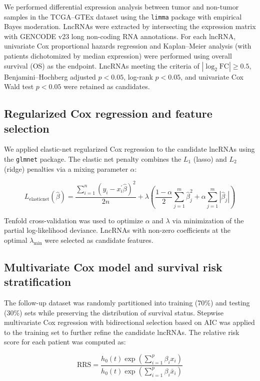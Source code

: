 \documentclass[fleqn,10pt]{wlscirep}
\begin{document}
We performed differential expression analysis between tumor and non-tumor samples in the TCGA--GTEx dataset using the \texttt{limma} package with empirical Bayes moderation\cite{RN26}. LncRNAs were extracted by intersecting the expression matrix with GENCODE v23 long non-coding RNA annotations. For each lncRNA, univariate Cox proportional hazards regression and Kaplan--Meier analysis (with patients dichotomized by median expression) were performed using overall survival (OS) as the endpoint. LncRNAs meeting the criteria of $|\log_2\text{FC}| \geq 0.5$, Benjamini--Hochberg adjusted $p < 0.05$, log-rank $p < 0.05$, and univariate Cox Wald test $p < 0.05$ were retained as candidates.

\subsection*{Regularized Cox regression and feature selection}

We applied elastic-net regularized Cox regression to the candidate lncRNAs using the \texttt{glmnet} package\cite{RN27,RN28}. The elastic net penalty combines the $L_1$ (lasso) and $L_2$ (ridge) penalties via a mixing parameter $\alpha$:

\begin{equation}\label{Elasticnet}
L_{\text{elasticnet}}(\hat{\beta}) = \frac{\sum_{i=1}^{n}(y_i - x_i^{\prime}\hat{\beta})^2}{2n} + \lambda\left(\frac{1-\alpha}{2}\sum_{j=1}^{m}\hat{\beta}_j^2 + \alpha\sum_{j=1}^{m}|\hat{\beta}_j|\right)
\end{equation}

Tenfold cross-validation was used to optimize $\alpha$ and $\lambda$ via minimization of the partial log-likelihood deviance. LncRNAs with non-zero coefficients at the optimal $\lambda_{\min}$ were selected as candidate features.

\subsection*{Multivariate Cox model and survival risk stratification}

The follow-up dataset was randomly partitioned into training (70\%) and testing (30\%) sets while preserving the distribution of survival status. Stepwise multivariate Cox regression with bidirectional selection based on AIC was applied to the training set to further refine the candidate lncRNAs. The relative risk score for each patient was computed as:

\begin{equation}\label{risk}
\text{RRS} = \frac{h_0(t) \exp\left(\sum_{i=1}^{p}\beta_i x_i\right)}{h_0(t) \exp\left(\sum_{i=1}^{p}\beta_i \bar{x}_i\right)}
\end{equation}
\end{document}
